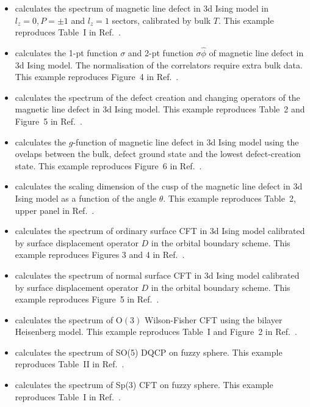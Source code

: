 \documentclass{timesjhep}
\begin{document}
\begin{itemize}
    \item {} calculates the spectrum of magnetic line defect in 3d Ising model in $l_z = 0, P = ±1$ and $l_z = 1$ sectors, calibrated by bulk $T$. This example reproduces Table~I in Ref.~\cite{Hu2023Aug}.
    \item {} calculates the 1-pt function $\sigma$ and 2-pt function $\sigma\hat{\phi}$ of magnetic line defect in 3d Ising model. The normalisation of the correlators require extra bulk data. This example reproduces Figure~4 in Ref.~\cite{Hu2023Aug}.
    \item {} calculates the spectrum of the defect creation and changing operators of the magnetic line defect in 3d Ising model. This example reproduces Table~2 and Figure~5 in Ref.~\cite{Zhou2024Jan}.
    \item {} calculates the $g$-function of magnetic line defect in 3d Ising model using the ovelaps between the bulk, defect ground state and the lowest defect-creation state. This example reproduces Figure~6 in Ref.~\cite{Zhou2024Jan}.
    \item {} calculates the scaling dimension of the cusp of the magnetic line defect in 3d Ising model as a function of the angle $\theta$. This example reproduces Table~2, upper panel in Ref.~\cite{Cuomo2024}.
    \item {} calculates the spectrum of ordinary surface CFT in 3d Ising model calibrated by surface displacement operator $D$ in the orbital boundary scheme. This example reproduces Figures 3 and 4 in Ref.~\cite{Zhou2024Jul}.
    \item {} calculates the spectrum of normal surface CFT in 3d Ising model calibrated by surface displacement operator $D$ in the orbital boundary scheme. This example reproduces Figure~5 in Ref.~\cite{Zhou2024Jul}.
    \item {} calculates the spectrum of $\mathrm{O}(3)$ Wilson-Fisher CFT using the bilayer Heisenberg model. This example reproduces Table~I and Figure~2 in Ref.~\cite{Han2023Dec}.
    \item {} calculates the spectrum of SO(5) DQCP on fuzzy sphere. This example reproduces Table~II in Ref.~\cite{Zhou2023}.
    \item {} calculates the spectrum of Sp(3) CFT on fuzzy sphere. This example reproduces Table~I in Ref.~\cite{Zhou2024Oct}.

\end{itemize}
\end{document}

